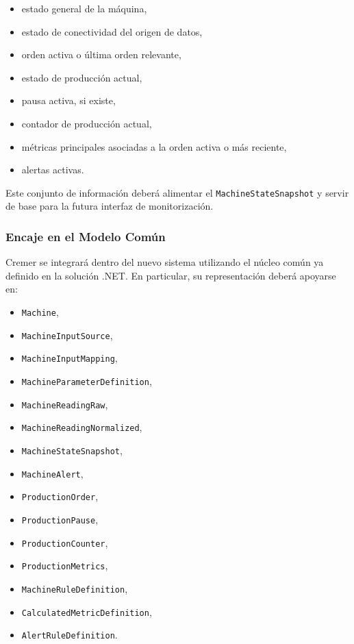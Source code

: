 \begin{itemize}
    \item estado general de la máquina,
    \item estado de conectividad del origen de datos,
    \item orden activa o última orden relevante,
    \item estado de producción actual,
    \item pausa activa, si existe,
    \item contador de producción actual,
    \item métricas principales asociadas a la orden activa o más reciente,
    \item alertas activas.
\end{itemize}

Este conjunto de información deberá alimentar el \texttt{MachineStateSnapshot} y servir de base para la futura interfaz de monitorización.

\subsubsection{Encaje en el Modelo Común}

Cremer se integrará dentro del nuevo sistema utilizando el núcleo común ya definido en la solución .NET. En particular, su representación deberá apoyarse en:

\begin{itemize}
    \item \texttt{Machine},
    \item \texttt{MachineInputSource},
    \item \texttt{MachineInputMapping},
    \item \texttt{MachineParameterDefinition},
    \item \texttt{MachineReadingRaw},
    \item \texttt{MachineReadingNormalized},
    \item \texttt{MachineStateSnapshot},
    \item \texttt{MachineAlert},
    \item \texttt{ProductionOrder},
    \item \texttt{ProductionPause},
    \item \texttt{ProductionCounter},
    \item \texttt{ProductionMetrics},
    \item \texttt{MachineRuleDefinition},
    \item \texttt{CalculatedMetricDefinition},
    \item \texttt{AlertRuleDefinition}.
\end{itemize}

